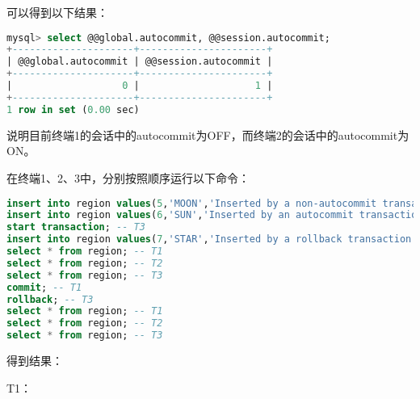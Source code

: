 \documentclass{article}
\begin{document}
可以得到以下结果：

\begin{lstlisting}[language=sql]
mysql> select @@global.autocommit, @@session.autocommit;
+---------------------+----------------------+
| @@global.autocommit | @@session.autocommit |
+---------------------+----------------------+
|                   0 |                    1 |
+---------------------+----------------------+
1 row in set (0.00 sec)
\end{lstlisting}

说明目前终端1的会话中的autocommit为OFF，而终端2的会话中的autocommit为ON。

在终端1、2、3中，分别按照顺序运行以下命令：

\begin{lstlisting}[language=sql]
insert into region values(5,'MOON','Inserted by a non-autocommit transaction.'); -- T1
insert into region values(6,'SUN','Inserted by an autocommit transaction.'); -- T2
start transaction; -- T3
insert into region values(7,'STAR','Inserted by a rollback transaction.'); -- T3
select * from region; -- T1
select * from region; -- T2
select * from region; -- T3
commit; -- T1
rollback; -- T3
select * from region; -- T1
select * from region; -- T2
select * from region; -- T3
\end{lstlisting}

得到结果：

T1：
\end{document}
